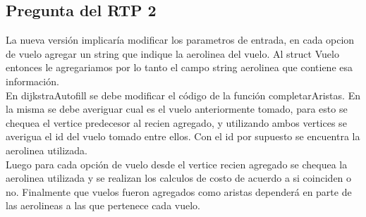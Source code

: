 \subsection{Pregunta del RTP 2}

La nueva versi\'on implicar\'ia modificar los parametros de entrada, en cada opcion de vuelo agregar un string que indique la aerolinea del vuelo. Al struct Vuelo entonces le agregariamos por lo tanto el campo string aerolinea que contiene esa informaci\'on. \\
En dijkstraAutofill se debe modificar el c\'odigo de la funci\'on completarAristas. En la misma se debe averiguar cual es el vuelo anteriormente tomado, para esto se chequea el vertice predecesor al recien agregado, y utilizando ambos vertices se averigua el id del vuelo tomado entre ellos. Con el id por supuesto se encuentra la aerolinea utilizada. \\
Luego para cada opci\'on de vuelo desde el vertice recien agregado se chequea la aerolinea utilizada y se realizan los calculos de costo de acuerdo a si coinciden o no. Finalmente que vuelos fueron agregados como aristas depender\'a en parte de las aerolineas a las que pertenece cada vuelo.